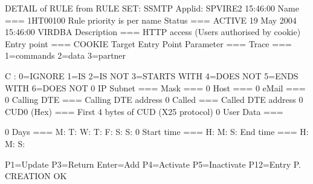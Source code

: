 \documentclass[letterpaper,10pt,english]{sphinxmanual}
\begin{document}
\begin{sphinxVerbatim}[commandchars=\\\{\}]
DETAIL of RULE from RULE SET: S\PYGZhy{}SMTP \PYGZhy{}\PYGZhy{}\PYGZhy{}\PYGZhy{}\PYGZhy{}\PYGZhy{}\PYGZhy{}\PYGZhy{}\PYGZhy{}\PYGZhy{}\PYGZhy{}\PYGZhy{}\PYGZhy{} Applid: SPVIRE2 15:46:00
Name          ===\PYGZgt{} 1HT00100               Rule priority is per name
Status        ===\PYGZgt{} ACTIVE                 19 May 2004 15:46:00 VIRDBA
Description   ===\PYGZgt{} HTTP access (Users authorised by cookie)
Entry point   ===\PYGZgt{} \PYGZdl{}COOKIE\PYGZdl{}               Target Entry Point
Parameter     ===\PYGZgt{}
Trace         ===\PYGZgt{}                        1=commands 2=data 3=partner

C : 0=IGNORE 1=IS 2=IS NOT 3=STARTS WITH 4=DOES NOT 5=ENDS WITH 6=DOES NOT
0 IP Subnet   ===\PYGZgt{}                        Mask ===\PYGZgt{}
0 Host        ===\PYGZgt{}
0 eMail       ===\PYGZgt{}
0 Calling DTE ===\PYGZgt{}                        Calling DTE address
0 Called      ===\PYGZgt{}                        Called DTE address
0 CUD0 (Hex)  ===\PYGZgt{}                        First 4 bytes of CUD (X25 protocol)
0 User Data   ===\PYGZgt{}

0 Days        ===\PYGZgt{} M:     T:      W:      T:      F:      S:      S:
0 Start time  ===\PYGZgt{} H:     M:      S:     End time ===\PYGZgt{} H:      M:      S:

P1=Update                        P3=Return                        Enter=Add
P4=Activate                      P5=Inactivate                    P12=Entry P.
CREATION OK
\end{sphinxVerbatim}

\end{document}
